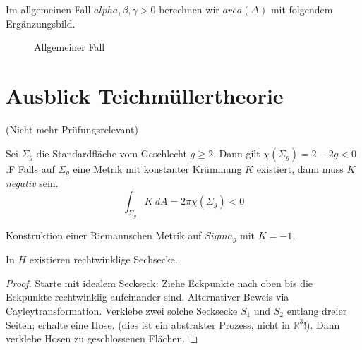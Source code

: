 \documentclass[../main.tex]{subfiles}
\begin{document}
Im allgemeinen Fall $alpha, \beta, \gamma >0$ berechnen wir $area(\Delta)$ mit folgendem Ergänzungsbild.

\begin{figure}[htb]
    \centering
    \def\svgwidth{35em}
    
    \caption*{Allgemeiner Fall}        
\end{figure}


\section{Ausblick Teichmüllertheorie}
(Nicht mehr Prüfungsrelevant)
\begin{recall}
    Sei $\Sigma _g$ die Standardfläche vom Geschlecht $g \ge 2$. Dann gilt $\chi (\Sigma _g)=2 -2g <0$.F
    Falls auf $\Sigma _g$ eine Metrik mit konstanter Krümmung $K$ existiert, dann muss $K$ \emph{negativ} sein.
    $$\int _{\Sigma _g}K \ dA = 2 \pi \chi(\Sigma _g) < 0$$
\end{recall}
Konstruktion einer Riemannschen Metrik auf $Sigma _g$ mit $K= -1$.
\begin{lemma}
    In $H$ existieren rechtwinklige Sechsecke.
\end{lemma}
\begin{proof}
    Starte mit idealem Seckseck: Ziehe Eckpunkte nach oben bis die Eckpunkte
    rechtwinklig aufeinander sind.
    Alternativer Beweis via Cayleytransformation.
    Verklebe zwei solche Secksecke $S_1$ und $S_2$ entlang dreier Seiten; erhalte eine
    Hose. (dies ist ein abstrakter Prozess, nicht in $\mathbb{R}^3$!).
    Dann verklebe Hosen zu geschlossenen Flächen.
\end{proof}
\end{document}
